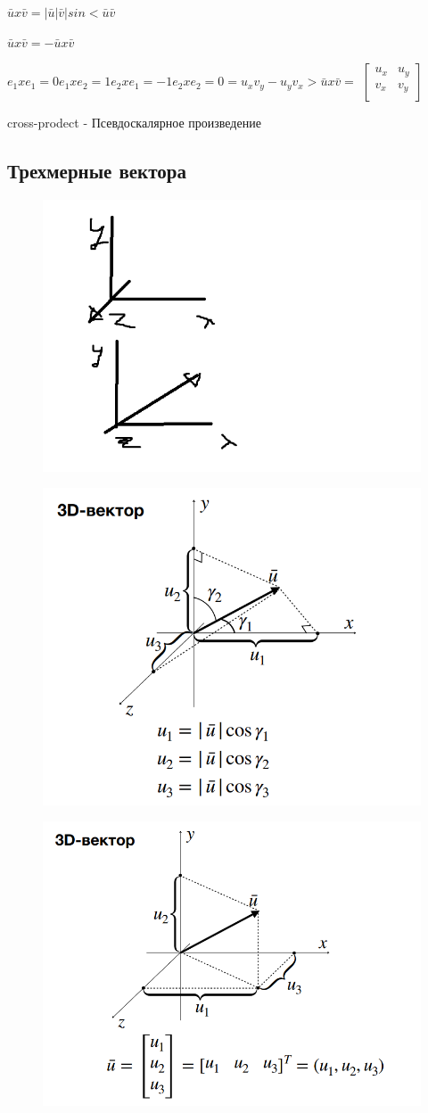\documentclass{article}
\begin{document}
$\bar{u} x \bar{v} = |\bar{u}|\bar{v}|sin < \bar{u} \bar{v}$

$\bar{u} x \bar{v} = -\bar{u} x \bar{v}$


$ e_1 x e_1 = 0
e_1 x e_2 = 1
e_2 x e_1 = -1
e_2 x e_2 = 0
= u_xv_y - u_yv_x > \bar{u} x \bar{v} = $ 
$ \begin{bmatrix}
    u_x & u_y \\
    v_x & v_y \\

\end{bmatrix} $

cross-prodect - Псевдоскалярное произведение 



\subsection{Трехмерные вектора}


\begin{figure} [H]
    \includegraphics[width=0.50\linewidth]{КоординатыПравЛев.png}
\end{figure}


\begin{figure} [H]
    \includegraphics[width=0.50\linewidth]{Снимок экрана 2025-03-10 131058.png}
\end{figure}

\begin{figure} [H]
    \includegraphics[width=0.50\linewidth]{Снимок экрана 2025-03-10 131148.png}
\end{figure}
\end{document}
